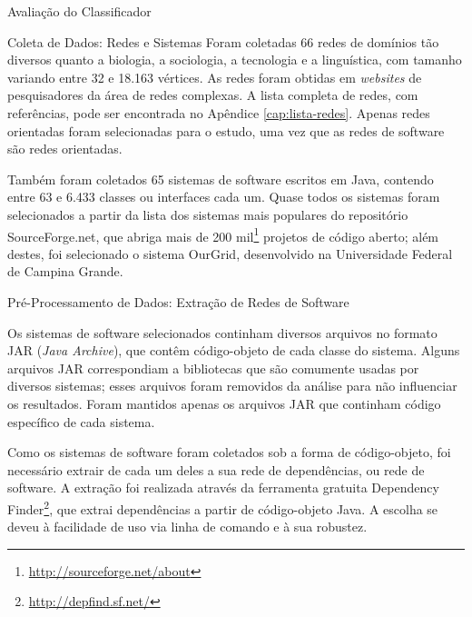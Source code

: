 \begin{section}{Avaliação do Classificador}
\begin{subsection}{Coleta de Dados: Redes e Sistemas}
			Foram coletadas 66 redes de domínios tão diversos quanto a biologia, a sociologia, a tecnologia e a linguística, com tamanho variando entre 32 e 18.163 vértices. As redes foram obtidas em \emph{websites} de pesquisadores da área de redes complexas. A lista completa de redes, com referências, pode ser encontrada no Apêndice \ref{cap:lista-redes}. Apenas redes orientadas foram selecionadas para o estudo, uma vez que as redes de software são redes orientadas. 

		  Também foram coletados 65 sistemas de software escritos em Java, contendo entre 63 e 6.433 classes ou interfaces cada um. Quase todos os sistemas foram selecionados a partir da lista dos sistemas mais populares do repositório SourceForge.net, que abriga mais de 200 mil\footnote{\url{http://sourceforge.net/about}} projetos de código aberto; além destes, foi selecionado o sistema OurGrid, desenvolvido na Universidade Federal de Campina Grande. 



\end{subsection}

\begin{subsection}{Pré-Processamento de Dados: Extração de Redes de Software}

	Os sistemas de software selecionados continham diversos arquivos no formato JAR (\emph{Java Archive}), que contêm código-objeto de cada classe do sistema. Alguns arquivos JAR correspondiam a bibliotecas que são comumente usadas por diversos sistemas; esses arquivos foram removidos da análise para não influenciar os resultados. Foram mantidos apenas os arquivos JAR que continham código específico de cada sistema.
	
	Como os sistemas de software foram coletados sob a forma de código-objeto, foi necessário extrair de cada um deles a sua rede de dependências, ou rede de software. A extração foi realizada através da ferramenta gratuita Dependency Finder\footnote{\url{http://depfind.sf.net/}}, que extrai dependências a partir de código-objeto Java. A escolha se deveu à facilidade de uso via linha de comando e à sua robustez.


\end{subsection}
\end{section}
